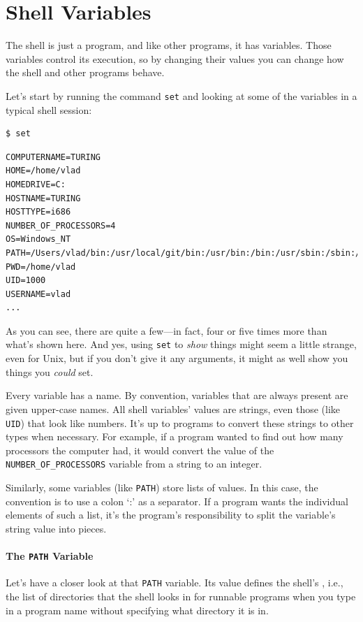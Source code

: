 \documentclass{book}
\begin{document}
\section{Shell Variables}

The shell is just a program, and like other programs, it has variables.
Those variables control its execution, so by changing their values you
can change how the shell and other programs behave.

Let's start by running the command \texttt{set} and looking at some of
the variables in a typical shell session:

\begin{verbatim}
$ set
\end{verbatim}

\begin{verbatim}
COMPUTERNAME=TURING
HOME=/home/vlad
HOMEDRIVE=C:
HOSTNAME=TURING
HOSTTYPE=i686
NUMBER_OF_PROCESSORS=4
OS=Windows_NT
PATH=/Users/vlad/bin:/usr/local/git/bin:/usr/bin:/bin:/usr/sbin:/sbin:/usr/local/bin
PWD=/home/vlad
UID=1000
USERNAME=vlad
...
\end{verbatim}

As you can see, there are quite a few---in fact, four or five times more
than what's shown here. And yes, using \texttt{set} to \emph{show}
things might seem a little strange, even for Unix, but if you don't give
it any arguments, it might as well show you things you \emph{could} set.

Every variable has a name. By convention, variables that are always
present are given upper-case names. All shell variables' values are
strings, even those (like \texttt{UID}) that look like numbers. It's up
to programs to convert these strings to other types when necessary. For
example, if a program wanted to find out how many processors the
computer had, it would convert the value of the
\texttt{NUMBER\_OF\_PROCESSORS} variable from a string to an integer.

Similarly, some variables (like \texttt{PATH}) store lists of values. In
this case, the convention is to use a colon `:' as a separator. If a
program wants the individual elements of such a list, it's the program's
responsibility to split the variable's string value into pieces.

\mbox{}\paragraph{The \texttt{PATH} Variable}

Let's have a closer look at that \texttt{PATH} variable. Its value
defines the shell's , i.e., the
list of directories that the shell looks in for runnable programs when
you type in a program name without specifying what directory it is in.
\end{document}
